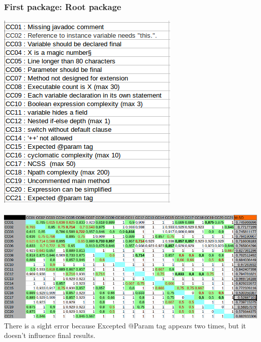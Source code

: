 \documentclass{article}
\begin{document}
\subsubsection{First package: Root package }
\includegraphics[scale=0.5]{names00.png}\\ \\
\includegraphics[scale=0.5]{00.png} \\
There is a sight error because Excepted @Param tag appears two times, but it doesn't influence final results.
\end{document}
